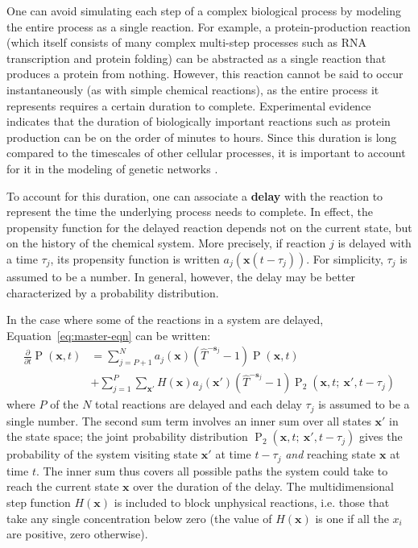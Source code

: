 \documentclass[english,letterpaper,12pt]{report}
\newcommand{\defkeywd}[1]{\textbf{#1}}
\renewcommand{\vec}[1]{\ensuremath{\mathbf{#1}}}
\DeclareMathOperator{\Prob}{P}
\newcommand{\delaytime}{\ensuremath{\tau}}
\begin{document}
\begin{doublespacing}
One can avoid simulating each step of a complex biological process by modeling the entire process as a single reaction. For example, a protein-production reaction (which itself consists of many complex multi-step processes such as RNA transcription and protein folding) can be abstracted as a single reaction that produces a protein from nothing. However, this reaction cannot be said to occur instantaneously (as with simple chemical reactions), as the entire process it represents requires a certain duration to complete. Experimental evidence indicates that the duration of biologically important reactions such as protein production can be on the order of minutes to hours. Since this duration is long compared to the timescales of other cellular processes, it is important to account for it in the modeling of genetic networks \cite{delay-oscillations}.

To account for this duration, one can associate a \defkeywd{delay} with the reaction to represent the time the underlying process needs to complete. In effect, the propensity function for the delayed reaction depends not on the current state, but on the history of the chemical system. More precisely, if reaction $j$ is delayed with a time $\delaytime_j$, its propensity function is written $a_j \left(\vec{x}(t - \delaytime_j) \right)$. For simplicity, $\delaytime_j$ is assumed to be a number. In general, however, the delay may be better characterized by a probability distribution.

In the case where some of the reactions in a system are delayed, Equation~\eqref{eq:master-eqn} can be written:
\begin{align}
    \frac{\partial}{\partial t} \Prob(\vec{x}, t) &= \sum_{j=P+1}^N a_j(\vec{x})(\hat{T}^{-\vec{s}_j} - 1)\Prob(\vec{x}, t) \\
                                                  &+ \sum_{j=1}^P \sum_{\vec{x}'} H(\vec{x}) a_j(\vec{x}') (\hat{T}^{-\vec{s}_j} - 1) \Prob_2(\vec{x}, t;\: \vec{x}', t - \delaytime_j)
    \label{eq:master-eqn-delay}
\end{align}
where $P$ of the $N$ total reactions are delayed and each delay $\delaytime_j$ is assumed to be a single number. The second sum term involves an inner sum over all states $\vec{x}'$ in the state space; the joint probability distribution $\Prob_2(\vec{x}, t;\: \vec{x}', t - \delaytime_j)$ gives the probability of the system visiting state $\vec{x}'$ at time $t - \delaytime_j$ \emph{and} reaching state $\vec{x}$ at time $t$. The inner sum thus covers all possible paths the system could take to reach the current state $\vec{x}$ over the duration of the delay. The multidimensional step function $H(\vec{x})$ is included to block unphysical reactions, i.e. those that take any single concentration below zero (the value of $H(\vec{x})$ is one if all the $x_i$ are positive, zero otherwise). 


\end{doublespacing}
\end{document}
